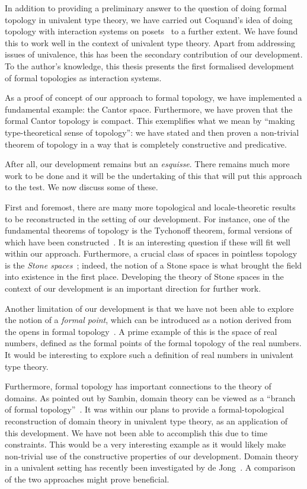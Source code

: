 In addition to providing a preliminary answer to the question of doing formal topology in
univalent type theory, we have carried out Coquand's idea of doing topology with
interaction systems on posets~\cite{coq-posets} to a further extent. We have found this to
work well in the context of univalent type theory. Apart from addressing issues of
univalence, this has been the secondary contribution of our development. To the author's
knowledge, this thesis presents the first formalised development of formal topologies as
interaction systems.

As a proof of concept of our approach to formal topology, we have implemented a
fundamental example: the Cantor space. Furthermore, we have proven that the formal Cantor
topology is compact. This exemplifies what we mean by ``making type-theoretical sense of
topology'': we have stated and then proven a non-trivial theorem of topology in a way that
is completely constructive and predicative.

After all, our development remains but an \emph{esquisse}. There remains much more work to
be done and it will be the undertaking of this that will put this approach to the test. We
now discuss some of these.

First and foremost, there are many more topological and locale-theoretic results to be
reconstructed in the setting of our development. For instance, one of the fundamental
theorems of topology is the Tychonoff theorem, formal versions of which have been
constructed~\cite{coq-tychonoff, vickers-tychonoff}. It is an interesting question if
these will fit well within our approach. Furthermore, a crucial class of spaces in
pointless topology is the \emph{Stone spaces}~\cite{stone-spaces}; indeed, the notion of a
Stone space is what brought the field into existence in the first place. Developing the
theory of Stone spaces in the context of our development is an important direction for
further work.

Another limitation of our development is that we have not been able to explore the notion
of a \emph{formal point}, which can be introduced as a notion derived from the opens in
formal topology~\cite[pg.~94]{coq-sambin}. A prime example of this is the space of real
numbers, defined as the formal points of the formal topology of the real numbers. It would
be interesting to explore such a definition of real numbers in univalent type theory.

Furthermore, formal topology has important connections to the theory of domains. As
pointed out by Sambin, domain theory can be viewed as a ``branch of formal
topology''~\cite{sambin-domains}. It was within our plans to provide a formal-topological
reconstruction of domain theory in univalent type theory, as an application of this
development. We have not been able to accomplish this due to time constraints. This would
be a very interesting example as it would likely make non-trivial use of the constructive
properties of our development. Domain theory in a univalent setting has recently been
investigated by de Jong~\cite{de-jong-domains}. A comparison of the two approaches might
prove beneficial.

